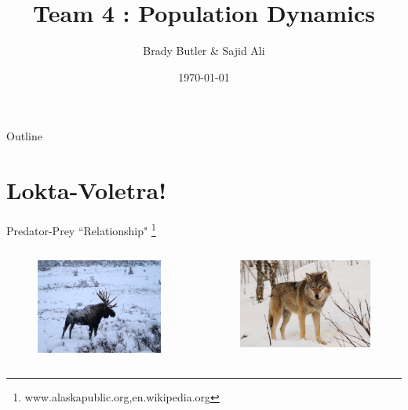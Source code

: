 \documentclass{beamer}
\title{Team 4 : Population Dynamics}
\author{Brady Butler\inst{1} \& Sajid Ali\inst{2}}
\institute 
{\inst{1}	
	Physics\\
	University of Maine\\
	\inst{2}%
	Applied Physics\\
	Northwestern University}
\date{\today}
\begin{document}
\begin{frame}
  \titlepage
\end{frame}

\begin{frame}{Outline}
  \tableofcontents
\end{frame}


\section{Lokta-Voletra!}
\begin{frame}{Predator-Prey ``Relationship" \footnote{www.alaskapublic.org,en.wikipedia.org}}
\begin{block}{}
	\begin{columns}[onlytextwidth,T]
		\column{\dimexpr\linewidth-30mm-10mm}
		\begin{itemize}
		\begin{figure}
			\vspace*{-1.1cm}\hspace*{-1.1cm}\includegraphics[width=50mm]{../plot_notebooks/moose_apr}
		\end{figure}
		\end{itemize}
		\column{30mm}
		\begin{figure}
			\vspace*{1.1cm}\hspace*{-1.1cm}\includegraphics[width=50mm]{../plot_notebooks/wiki_wolf}
		\end{figure}
	\end{columns}
\end{block}
\end{frame}
\end{document}
